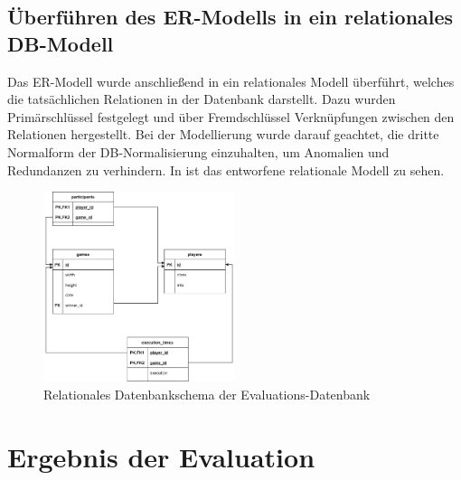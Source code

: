 \subsection{Überführen des \ac{ER}-Modells in ein relationales \acl{DB}-Modell}
\label{subsec:db-schema}

Das \ac{ER}-Modell wurde anschließend in ein relationales Modell überführt, welches die tatsächlichen Relationen in der
Datenbank darstellt.
Dazu wurden Primärschlüssel festgelegt und über Fremdschlüssel Verknüpfungen zwischen den Relationen hergestellt.
Bei der Modellierung wurde darauf geachtet, die dritte Normalform der \ac{DB}-Normalisierung einzuhalten,
um Anomalien und Redundanzen zu verhindern.
In  ist das entworfene relationale Modell zu sehen.

\begin{figure}[htb]
	\centering
	\includegraphics[width=0.5\textwidth]{Bilder/relationales_db_schema.png}
	\caption{Relationales Datenbankschema der Evaluations-Datenbank}
	\label{fig:relationales-db-schema}
\end{figure}

\section{Ergebnis der Evaluation}
\label{sec:ergebnis-evaluation}

